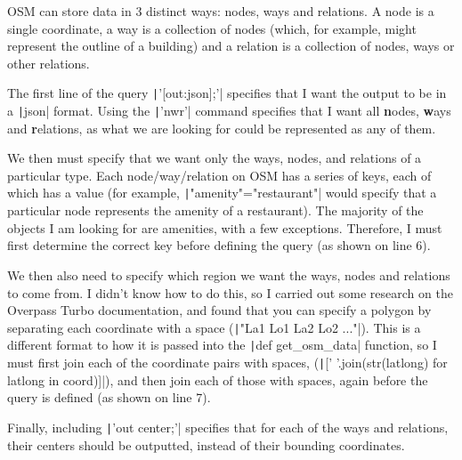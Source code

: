\documentclass[12pt]{report}
\newcommand{\pil}[1]{\protect\texttt|#1|}
\begin{document}
OSM can store data in 3 distinct ways: nodes, ways and relations. A node is a single coordinate, a way is a collection of nodes (which, for example, might represent the outline of a building) and a relation is a collection of nodes, ways or other relations.

The first line of the query \pil{'[out:json];'} specifies that I want the output to be in a \pil{json} format. Using the \pil{'nwr'} command specifies that I want all \textbf{n}odes, \textbf{w}ays and \textbf{r}elations, as what we are looking for could be represented as any of them.

We then must specify that we want only the ways, nodes, and relations of a particular type. Each node/way/relation on OSM has a series of keys, each of which has a value (for example, \pil{"amenity"="restaurant"} would specify that a particular node represents the amenity of a restaurant). The majority of the objects I am looking for are amenities, with a few exceptions. Therefore, I must first determine the correct key before defining the query (as shown on line 6).

We then also need to specify which region we want the ways, nodes and relations to come from. I didn't know how to do this, so I carried out some research on the Overpass Turbo documentation, and found that you can specify a polygon by separating each coordinate with a space (\pil{"La1 Lo1 La2 Lo2 ..."}). This is a different format to how it is passed into the \pil{def get_osm_data} function, so I must first join each of the coordinate pairs with spaces, (\pil{[' '.join(str(latlong) for latlong in coord)]}), and then join each of those with spaces, again before the query is defined (as shown on line 7).

Finally, including \pil{'out center;'} specifies that for each of the ways and relations, their centers should be outputted, instead of their bounding coordinates.
\end{document}

